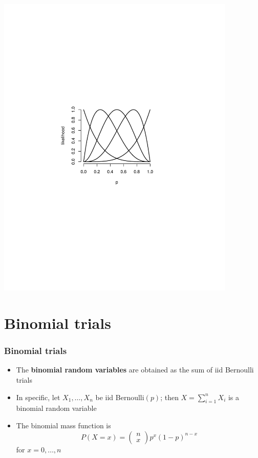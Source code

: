 \documentclass[aspectratio=169]{beamer}
\begin{document}
\begin{frame}
\includegraphics[width=4.5in]{bernoulliLikelihood.pdf}
\end{frame}

\section{Binomial trials}
\begin{frame}\frametitle{Binomial trials}
\begin{itemize}
\item The {\bf binomial random variables} are obtained as the sum of iid Bernoulli trials
\item In specific, let $X_1,\ldots,X_n$ be iid Bernoulli$(p)$; then $X = \sum_{i=1}^n X_i$
  is a binomial random variable
\item The binomial mass function is
$$
P(X = x) = 
\left(
\begin{array}{c}
  n \\ x
\end{array}
\right)
p^x(1 - p)^{n-x}
$$
for $x=0,\ldots,n$
\end{itemize}
\end{frame}
\end{document}
